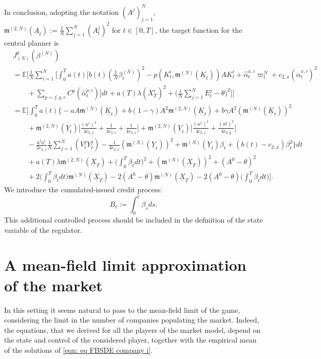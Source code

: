 \documentclass[11pt,twoside]{amsart}
\theoremstyle{definition}
\numberwithin{equation}{section}
\newcommand{\w}{\varpi}
\newcommand{\E}{\mathbb{E}}
\renewcommand{\hat}{\widehat}
\newcommand{\avg}{\frac{1}{N}\sum_{j = 1}^N}
\begin{document}
In conclusion, adopting the notation $(A^j)_{j= 1}^N$, $\mathfrak{m}^{(2,N)}(\underline{A}_t) := \frac{1}{N} \sum_{j =1}^N (A^j_t)^2$ for $t\in[0,T]$, the target function for the central planner is 
\begin{align*}
    &J^0_{(N)}(\beta^{(N)}) \\
    &= \E\Bigg[\frac{1}{N}\sum_{i = 1}^N \bigg[ \int_0^Ta(t)\bigg[b(t)\left(\frac{1}{N}\beta^{(N)}_t\right)^2 -p(K^i_t, \mathfrak{m}^{(N)}(\underline{K}_t)) AK^i_t + \hat\alpha^{x,i}_t \w^N_t + c_{2,x}(\hat\alpha^{x,i}_t)^2 \\
    &\qquad + \sum_{p = f,g,e}C^p(\hat\alpha^{p,i}_t)\bigg] dt + a(T)\lambda (X^i_T)^2 + \bigg( \avg E^j_t - \theta\bigg)^2\bigg] \Bigg]\\
    &= \E\bigg[ \int_0^Ta(t) \bigg\{-aA\mathfrak{m}^{(N)} (\underline{K}_t) + b(1-\gamma) A^2 \mathfrak{m}^{(2,N)}(\underline{K}_t) + b\gamma A^2 (\mathfrak{m}^{(N)}(\underline{K}_t))^2 \\
    &\qquad + \mathfrak{m}^{(2,N)}(\underline{Y}_t) \bigg[\frac{(a^e)^2}{4c_{2,f}} + \frac{1}{4c_{2,e}} + \frac{1}{4c_{2,x}}\bigg] +  \mathfrak{m}^{(2,N)}(\underline{V}_t) \bigg[\frac{(a^f)^2}{4c_{2,f}} + \frac{(a^g)^2}{4c_{2,g}}\bigg]\\
    &\qquad - \frac{a^fa^e}{2 c_{2,f}} \avg (V^j_tY^j_t) - \frac{1}{4c_{2,x}}(\mathfrak{m}^{(N)}(\underline{Y}_t))^2 + \mathfrak{m}^{(N)}(\underline{Y}_t)\beta_t +(b(t)- c_{2,x})\beta^2_t \bigg\}dt \\
    &\qquad+ a(T) \lambda \mathfrak{m}^{(2,N)}(\underline{X}_T) +\bigg(\int_0^T\beta_tdt\bigg)^2 + ( \mathfrak{m}^{(N)}(\underline{X}_T))^2 + (A^0 - \theta)^2 \\
    &\qquad+ 2\bigg(\int_0^T \beta_tdt\bigg)\mathfrak{m}^{(N)}(\underline{X}_T) - 2(A^0 - \theta) \mathfrak{m}^{(N)}(\underline{X}_T) - 2(A^0-\theta) \bigg(\int_0^T\beta_t dt\bigg)\bigg].
\end{align*}
We introduce the cumulated-issued credit process: 
\begin{equation}
    \label{eqn: process Bt}
    B_t := \int_0^t \beta_sds.
\end{equation}
This additional controlled process should be included in the definition of the state variable of the regulator. 


\section{A mean-field limit approximation of the market}
\label{section: mean field approach}
In this setting it seems natural to pass to the mean-field limit of the game, considering the limit in the number of companies populating the market. Indeed, the equations, that we derived for all the players of the market model, depend on the state and control of the considered player, together with the empirical mean of the solutions of \eqref{eqn: eq FBSDE company i}. 
\end{document}
